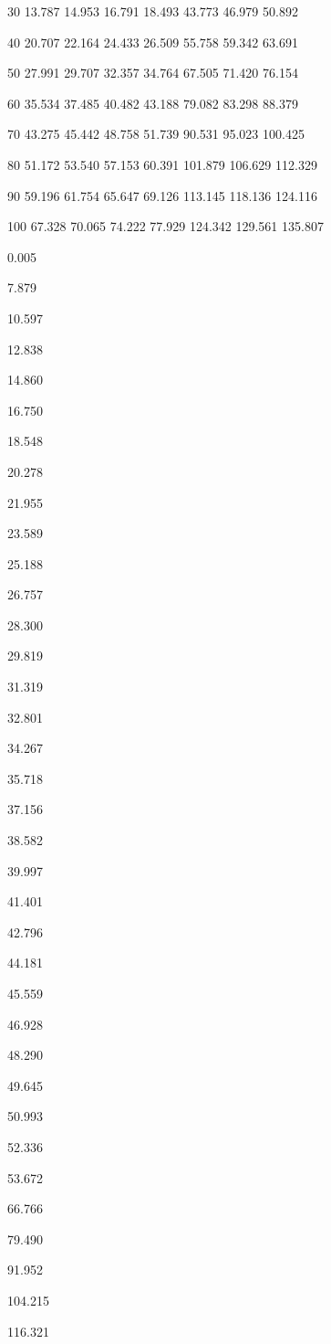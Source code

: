 \documentclass[a4paper,portrait,12pt]{article}
\begin{document}
30 13.787 14.953 16.791 18.493 43.773 46.979 50.892


40 20.707 22.164 24.433 26.509 55.758 59.342 63.691


50 27.991 29.707 32.357 34.764 67.505 71.420 76.154


60 35.534 37.485 40.482 43.188 79.082 83.298 88.379


70 43.275 45.442 48.758 51.739 90.531 95.023 100.425


80 51.172 53.540 57.153 60.391 101.879 106.629 112.329


90 59.196 61.754 65.647 69.126 113.145 118.136 124.116


100 67.328 70.065 74.222 77.929 124.342 129.561 135.807





0.005


7.879


10.597


12.838


14.860


16.750


18.548


20.278


21.955


23.589


25.188


26.757


28.300


29.819


31.319


32.801


34.267


35.718


37.156


38.582


39.997


41.401


42.796


44.181


45.559


46.928


48.290


49.645


50.993


52.336


53.672


66.766


79.490


91.952


104.215


116.321
\end{document}
